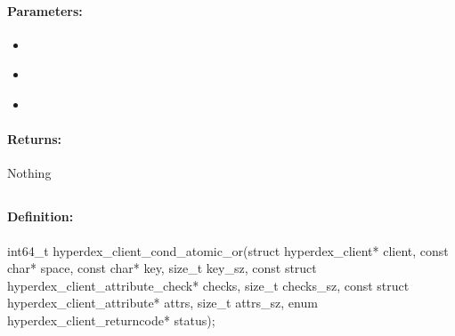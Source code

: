\paragraph{Parameters:}
\begin{itemize}[noitemsep]
\item {}\\

\item {}\\

\item {}\\

\end{itemize}

\paragraph{Returns:}
Nothing
\pagebreak
\subsection{}
\label{api:c:cond_atomic_or}


\paragraph{Definition:}
\begin{ccode}
int64_t hyperdex_client_cond_atomic_or(struct hyperdex_client* client,
        const char* space,
        const char* key, size_t key_sz,
        const struct hyperdex_client_attribute_check* checks, size_t checks_sz,
        const struct hyperdex_client_attribute* attrs, size_t attrs_sz,
        enum hyperdex_client_returncode* status);
\end{ccode}

